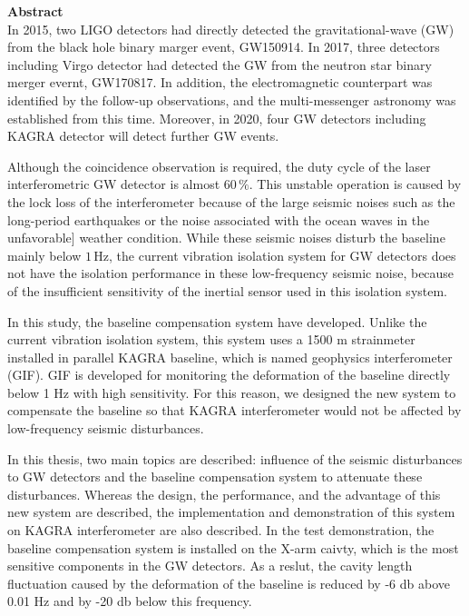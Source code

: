 \clearpage
{\huge \bf Abstract} \\

In 2015, two LIGO detectors had directly detected the gravitational-wave (GW) from the black hole binary marger event, GW150914. In 2017, three detectors including Virgo detector had detected the GW from the neutron star binary merger evernt, GW170817. In addition, the electromagnetic counterpart was identified by the follow-up observations, and the multi-messenger astronomy was established from this time. Moreover, in 2020, four GW detectors including KAGRA detector will detect further GW events.

Although the coincidence observation is required, the duty cycle of the laser interferometric GW detector is almost $60\,\%$. This unstable operation is caused by the lock loss of the interferometer because of the large seismic noises such as the long-period earthquakes or the noise associated with the ocean waves in the unfavorable] weather condition. While these seismic noises disturb the baseline mainly below $1\,\mathrm{Hz}$, the current vibration isolation system for GW detectors does not have the isolation performance in these low-frequency seismic noise, because of the insufficient sensitivity of the inertial sensor used in this isolation system.

  In this study, the baseline compensation system have developed. Unlike the current vibration isolation system, this system uses a 1500 m strainmeter installed in parallel KAGRA baseline, which is named geophysics interferometer (GIF). GIF is developed for monitoring the deformation of the baseline directly below 1 Hz with high sensitivity. For this reason, we designed the new system to compensate the baseline so that KAGRA interferometer would not be affected by low-frequency seismic disturbances.

  In this thesis, two main topics are described: influence of the seismic disturbances to GW detectors and the baseline compensation system to attenuate these disturbances. Whereas the design, the performance, and the advantage of this new system are described, the implementation and demonstration of this system on KAGRA interferometer are also described. In the test demonstration, the baseline compensation system is installed on the X-arm caivty, which is the most sensitive components in the GW detectors. As a reslut, the cavity length fluctuation caused by the deformation of the baseline is reduced by -6 db above 0.01 Hz and by -20 db below this frequency.  
